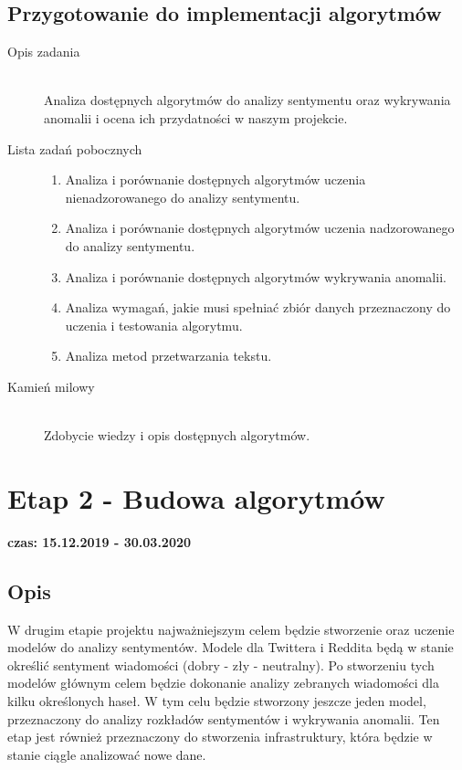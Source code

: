 \documentclass[a4paper,11pt, notitlepage ]{article}
\begin{document}
\subsection{Przygotowanie do implementacji algorytmów}
    \begin{description}
        \item[Opis zadania] \hfill \\ Analiza dostępnych algorytmów do analizy sentymentu oraz wykrywania anomalii i ocena ich przydatności w naszym projekcie.
         
        \item[Lista zadań pobocznych] \hfill 
        \begin{enumerate}
            \item Analiza i porównanie dostępnych algorytmów uczenia nienadzorowanego do analizy sentymentu.
            \item Analiza i porównanie dostępnych algorytmów uczenia nadzorowanego do analizy sentymentu.
            \item Analiza i porównanie dostępnych algorytmów wykrywania anomalii.
            \item Analiza wymagań, jakie musi spełniać zbiór danych przeznaczony do uczenia i testowania algorytmu.
            \item Analiza metod przetwarzania tekstu.
        \end{enumerate}

        \item[Kamień milowy] \hfill \\
        Zdobycie wiedzy i opis dostępnych algorytmów.


        
    \end{description}    

\section{Etap 2 - Budowa algorytmów}
\textbf{czas: 15.12.2019 - 30.03.2020}

\subsection{Opis} 
W drugim etapie projektu najważniejszym celem będzie stworzenie oraz uczenie modelów do analizy sentymentów. Modele dla Twittera i Reddita
będą w stanie określić sentyment wiadomości (dobry - zły - neutralny). Po stworzeniu tych modelów głównym celem będzie dokonanie analizy
zebranych wiadomości dla kilku określonych haseł. W tym celu będzie stworzony jeszcze jeden model, przeznaczony do analizy rozkładów sentymentów
i wykrywania anomalii. Ten etap jest również przeznaczony do stworzenia infrastruktury, która będzie w stanie ciągle analizować nowe dane.
\end{document}
